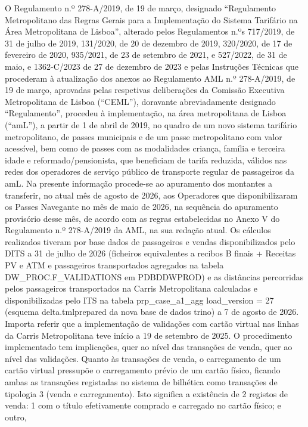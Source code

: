 \documentclass[
  a4paper,
]{article}
\begin{document}
O Regulamento n.º 278-A/2019, de 19 de março, designado ``Regulamento
Metropolitano das Regras Gerais para a Implementação do Sistema
Tarifário na Área Metropolitana de Lisboa'', alterado pelos Regulamentos
n.ºs 717/2019, de 31 de julho de 2019, 131/2020, de 20 de dezembro de
2019, 320/2020, de 17 de fevereiro de 2020, 935/2021, de 23 de setembro
de 2021, e 527/2022, de 31 de maio, e 1362-C/2023 de 27 de dezembro de
2023 e pelas Instruções Técnicas que procederam à atualização dos anexos
ao Regulamento AML n.º 278-A/2019, de 19 de março, aprovadas pelas
respetivas deliberações da Comissão Executiva Metropolitana de Lisboa
(``CEML''), doravante abreviadamente designado ``Regulamento'', procedeu
à implementação, na área metropolitana de Lisboa (``amL''), a partir de
1 de abril de 2019, no quadro de um novo sistema tarifário
metropolitano, de passes municipais e de um passe metropolitano com
valor acessível, bem como de passes com as modalidades criança, família
e terceira idade e reformado/pensionista, que beneficiam de tarifa
reduzida, válidos nas redes dos operadores de serviço público de
transporte regular de passageiros da amL. Na presente informação
procede-se ao apuramento dos montantes a transferir, no atual mês de
agosto de 2026, aos Operadores que disponibilizaram os Passes Navegante
no mês de maio de 2026, na sequência do apuramento provisório desse mês,
de acordo com as regras estabelecidas no Anexo V do Regulamento n.º
278-A/2019 da AML, na sua redação atual. Os cálculos realizados tiveram
por base dados de passageiros e vendas disponibilizados pelo DITS a 31
de julho de 2026 (ficheiros equivalentes a recibos B finais + Receitas
PV e ATM e passageiros transportados agregados na tabela
DW\_PROC.F\_VALIDATIONS em PDBDDWPROD) e as distâncias percorridas pelos
passageiros transportados na Carris Metropolitana calculadas e
disponibilizadas pelo ITS na tabela prp\_case\_a1\_agg load\_version =
27 (esquema delta.tmlprepared da nova base de dados trino) a 7 de agosto
de 2026. Importa referir que a implementação de validações com cartão
virtual nas linhas da Carris Metropolitana teve início a 19 de setembro
de 2025. O procedimento implementado tem implicações, quer ao nível das
transações de venda, quer ao nível das validações. Quanto às transações
de venda, o carregamento de um cartão virtual pressupõe o carregamento
prévio de um cartão físico, ficando ambas as transações registadas no
sistema de bilhética como transações de tipologia 3 (venda e
carregamento). Isto significa a existência de 2 registos de venda: 1 com
o título efetivamente comprado e carregado no cartão físico; e outro,
\end{document}
